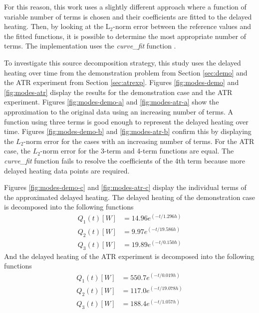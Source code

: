 For this reason, this work uses a slightly different approach where a function of variable number of terms is chosen and their coefficients are fitted to the delayed heating.
Then, by looking at the L$_2$-norm error between the reference values and the fitted functions, it is possible to determine the most appropriate number of terms.
The implementation uses the \textit{curve\_fit} function \cite{2020SciPy-NMeth}.

To investigate this source decomposition strategy, this study uses the delayed heating over time from the demonstration problem from Section \ref{sec:demo} and the ATR experiment from Section \ref{sec:atrexp}.
Figures \ref{fig:modes-demo} and \ref{fig:modes-atr} display the results for the demonstration case and the ATR experiment.
Figures \ref{fig:modes-demo-a} and \ref{fig:modes-atr-a} show the approximation to the original data using an increasing number of terms.
A function using three terms is good enough to represent the delayed heating over time.
Figures \ref{fig:modes-demo-b} and \ref{fig:modes-atr-b} confirm this by displaying the $L_2$-norm error for the cases with an increasing number of terms.
For the ATR case, the $L_2$-norm error for the 3-term and 4-term functions are equal.
The \textit{curve\_fit} function fails to resolve the coefficients of the 4th term because more delayed heating data points are required.

Figures \ref{fig:modes-demo-c} and \ref{fig:modes-atr-c} display the individual terms of the approximated delayed heating.
The delayed heating of the demonstration case is decomposed into the following functions
\begin{align}
Q_1(t)[W] &= 14.96 e^{(-t / 1.296 h)}  \\
Q_2(t)[W] &=  9.97 e^{(-t / 19.586 h)}  \\
Q_3(t)[W] &= 19.89 e^{(-t / 0.150 h)}
\end{align}
And the delayed heating of the ATR experiment is decomposed into the following functions
\begin{align}
Q_1(t)[W] &= 550.7 e^{(-t / 0.019 h)}  \\
Q_2(t)[W] &= 117.0 e^{(-t / 19.078 h)}  \\
Q_3(t)[W] &= 188.4 e^{(-t / 1.057 h)}
\end{align}

